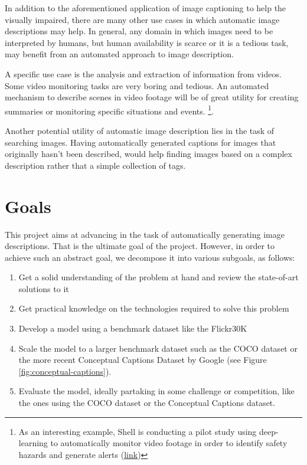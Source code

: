 In addition to the aforementioned application of image captioning to help the visually impaired, there are many other use cases in which automatic image descriptions may help. In general, any domain in which images need to be interpreted by humans, but human availability is scarce or it is a tedious task, may benefit from an automated approach to image description.

A specific use case is the analysis and extraction of information from videos. Some video monitoring tasks are very boring and tedious. An automated mechanism to describe scenes in video footage will be of great utility for creating summaries or monitoring specific situations and events. \footnote{As an interesting example, Shell is conducting a pilot study using deep-learning to automatically monitor video footage in order to identify safety hazards and generate alerts (\href{https://customers.microsoft.com/en-us/story/shell-mining-oil-gas-azure-databricks}{link})}.

Another potential utility of automatic image description lies in the task of searching images. Having automatically generated captions for images that originally hasn't been described, would help finding images based on a complex description rather that a simple collection of tags.

\section{Goals}

This project aims at advancing in the task of automatically generating image descriptions. That is the ultimate goal of the project. However, in order to achieve such an abstract goal, we decompose it into various subgoals, as follows:

\begin{enumerate}
\item Get a solid understanding of the problem at hand and review the state-of-art solutions to it
\item Get practical knowledge on the technologies required to solve this problem
\item Develop a model using a benchmark dataset like the Flickr30K
\item Scale the model to a larger benchmark dataset such as the COCO\cite{Lin2014} dataset or the more recent Conceptual Captions Dataset by Google \cite{Sharma2018}  (see Figure \ref{fig:conceptual-captions}).
\item Evaluate the model, ideally partaking in some challenge or competition, like the ones using the COCO dataset or the Conceptual Captions dataset.
\end{enumerate}

